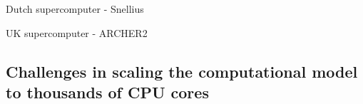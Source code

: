 Dutch supercomputer - Snellius

UK supercomputer - ARCHER2


\begin{subappendices}

\section{Challenges in scaling the computational model to thousands of CPU cores}


\end{subappendices}


\cleardoublepage

